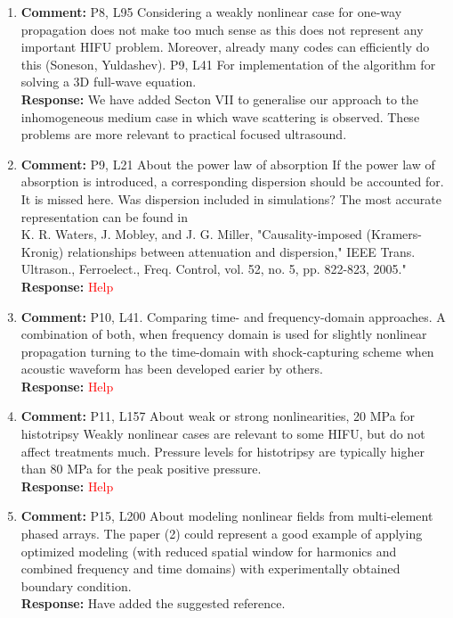 \documentclass[11pt]{article}
\begin{document}
\begin{enumerate}
	\item \textbf{Comment:} P8, L95  Considering a weakly nonlinear case for one-way propagation does not make too much sense as this does not represent any important HIFU problem. Moreover, already many codes can efficiently do this (Soneson, Yuldashev). P9, L41 For implementation of the algorithm for solving a 3D full-wave equation. \\
	\textbf{Response:} We have added Secton VII to generalise our approach to the inhomogeneous medium 
	case in which wave scattering is observed. These problems are more relevant to practical focused ultrasound.

	\item \textbf{Comment:} P9, L21 About the power law of absorption
	If the power law of absorption is introduced, a corresponding dispersion should be accounted for. It is missed here. Was dispersion included in simulations? The most accurate representation can be found in \\
	K. R. Waters, J. Mobley, and J. G. Miller, "Causality-imposed (Kramers-Kronig) relationships between attenuation and dispersion," IEEE Trans. Ultrason., Ferroelect., Freq. Control, vol. 52, no. 5, pp. 822-823, 2005." \\
	\textbf{Response:} \textcolor{red}{Help}

	\item \textbf{Comment:} P10, L41. Comparing time- and frequency-domain approaches. 
	A combination of both, when frequency domain is used for slightly nonlinear propagation turning to the time-domain with shock-capturing scheme when acoustic waveform has been developed earier by others. \\
	\textbf{Response:} \textcolor{red}{Help}
	
	\item \textbf{Comment:} P11, L157 About weak or strong nonlinearities, 20 MPa for histotripsy
	Weakly nonlinear cases are relevant to some HIFU, but do not affect treatments much.
	Pressure levels for histotripsy are typically higher than 80 MPa for the peak positive pressure.\\
	\textbf{Response:} \textcolor{red}{Help}

	\item \textbf{Comment:} P15, L200  About modeling nonlinear fields from multi-element phased arrays. 
	The paper (2) could represent a good example of applying optimized modeling (with reduced spatial window for harmonics and combined frequency and time domains) with experimentally obtained boundary condition.\\
	\textbf{Response:} Have added the suggested reference.


\end{enumerate}
\end{document}
